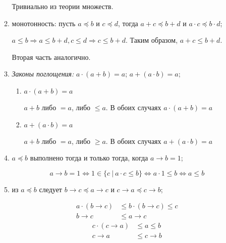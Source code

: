 \begin{enumerate}
\begin{enumerate}
                        Тривиально из теории множеств.

                  \item монотонность: пусть $a \preceq b$ и $c \preceq d$, тогда $a + c \preceq b + d$ и $a \cdot c \preceq b \cdot d$;

                        \(a \leq b \Rightarrow a \leq b + d, c \leq d \Rightarrow c \leq b + d\). Таким образом, \(a + c \leq b + d\).

                        Вторая часть аналогично.

                  \item \emph{Законы поглощения:} $a \cdot (a + b) = a$; $a + (a \cdot b) = a$;

                        \begin{enumerate}
                              \item \(a\cdot (a + b) = a\)

                                    \(a + b\) либо \( = a\), либо \( \leq a\). В обоих случаях \(a\cdot (a + b) = a\)

                              \item \(a + (a \cdot b) = a\)

                                    \(a + b\) либо \( = a\), либо \( \geq a\). В обоих случаях \(a + (a \cdot b) = a\)
                        \end{enumerate}

                  \item $a \preceq b$ выполнено тогда и только тогда, когда $a \rightarrow b = 1$;

                        \[a \to b = 1 \Leftrightarrow 1 \in \{c\ |\ a\cdot c \leq b\} \Leftrightarrow a\cdot 1 \leq b \Leftrightarrow a \leq b\]

                  \item из $a \preceq b$ следует $b\rightarrow c \preceq a\rightarrow c$ и $c\rightarrow a \preceq c \rightarrow b$;

                        \begin{align*}
                              a \cdot (b \to c) & \leq b \cdot (b \to c) \leq c \\
                              b \to c           & \leq a \to c
                        \end{align*}
                        \begin{align*}
                              c \cdot (c \to a) & \leq a \leq b \\
                              c \to a           & \leq c \to b
                        \end{align*}


\end{enumerate}
\end{enumerate}
